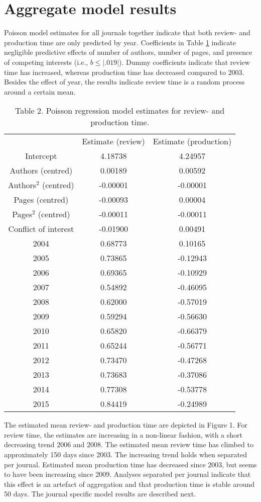 \section*{Aggregate model results}
Poisson model estimates for all journals together indicate that both review- and production time are only predicted by year. Coefficients in Table \ref{tab:tab2} indicate negligible predictive effects of number of authors, number of pages, and presence of competing interests (i.e., $b \leq |.019|$). Dummy coefficients indicate that review time has increased, whereas production time has decreased compared to 2003. Besides the effect of year, the results indicate review time is a random process around a certain mean.

\begin{table}
\caption{Table 2. Poisson regression model estimates for review- and production time.}
\label{tab:tab2}
\begin{tabular}{ c c c }
    & Estimate (review) & Estimate (production) \\
    Intercept & 4.18738 & 4.24957 \\
    Authors (centred) & 0.00189 & 0.00592 \\
    Authors$^2$ (centred) & -0.00001 & -0.00001 \\
    Pages (centred) & -0.00093 & 0.00004 \\
    Pages$^2$ (centred) & -0.00011 & -0.00011 \\
    Conflict of interest & -0.01900 & 0.00491 \\
    2004  & 0.68773 & 0.10165 \\
    2005  & 0.73865 & -0.12943 \\
    2006  & 0.69365 & -0.10929 \\
    2007  & 0.54892 & -0.46095 \\
    2008  & 0.62000 & -0.57019 \\
    2009  & 0.59294 & -0.56630 \\
    2010  & 0.65820 & -0.66379 \\
    2011  & 0.65244 & -0.56771 \\
    2012  & 0.73470 & -0.47268 \\
    2013  & 0.73683 & -0.37086 \\
    2014  & 0.77308 & -0.53778 \\
    2015  & 0.84419 & -0.24989 \\
\end{tabular}
\end{table}

The estimated mean review- and production time are depicted in Figure 1. For review time, the estimates are increasing in a non-linear fashion, with a short decreasing trend 2006 and 2008. The estimated mean review time has climbed to approximately 150 days since 2003. The increasing trend holds when separated per journal. Estimated mean production time has decreased since 2003, but seems to have been increasing since 2009. Analyses separated per journal indicate that this effect is an artefact of aggregation and that production time is stable around 50 days. The journal specific model results are described next.
